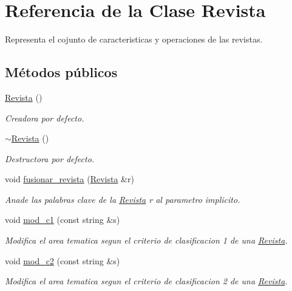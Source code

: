 \hypertarget{class_revista}{\section{Referencia de la Clase Revista}
\label{class_revista}
}


Representa el cojunto de caracteristicas y operaciones de las revistas.  


\subsection*{Métodos públicos}
\begin{DoxyCompactItemize}
\item 
\hyperlink{class_revista_a4d3790c7da4821edc95e09f3c34b8332}{Revista} ()
\begin{DoxyCompactList}\small\item\em Creadora por defecto. \end{DoxyCompactList}\item 
\hyperlink{class_revista_ab705e2fe5ec9a46daf3a69835772a3c6}{$\sim$\-Revista} ()
\begin{DoxyCompactList}\small\item\em Destructora por defecto. \end{DoxyCompactList}\item 
void \hyperlink{class_revista_a039821163b9175aa556d94b6d7fd6f63}{fusionar\-\_\-revista} (\hyperlink{class_revista}{Revista} \&r)
\begin{DoxyCompactList}\small\item\em Anade las palabras clave de la \hyperlink{class_revista}{Revista} r al parametro implicito. \end{DoxyCompactList}\item 
void \hyperlink{class_revista_a526d3f522dfdd299ddd7ef3d317c3101}{mod\-\_\-c1} (const string \&s)
\begin{DoxyCompactList}\small\item\em Modifica el area tematica segun el criterio de clasificacion 1 de una \hyperlink{class_revista}{Revista}. \end{DoxyCompactList}\item 
void \hyperlink{class_revista_af48636e38adc7248ae7a2028e51bc9f2}{mod\-\_\-c2} (const string \&s)
\begin{DoxyCompactList}\small\item\em Modifica el area tematica segun el criterio de clasificacion 2 de una \hyperlink{class_revista}{Revista}. \end{DoxyCompactList}\item 

\end{DoxyCompactItemize}
